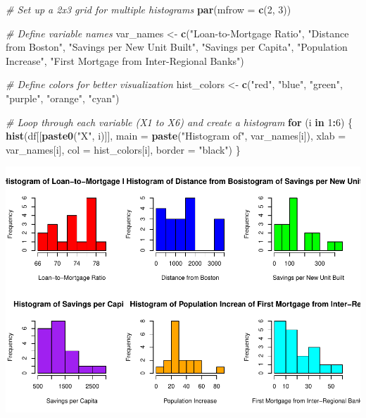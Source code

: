 \documentclass[
  12pt,
]{article}
\newenvironment{Shaded}{\begin{snugshade}}{\end{snugshade}}
\newcommand{\AttributeTok}[1]{\textcolor[rgb]{0.13,0.29,0.53}{#1}}
\newcommand{\CommentTok}[1]{\textcolor[rgb]{0.56,0.35,0.01}{\textit{#1}}}
\newcommand{\ControlFlowTok}[1]{\textcolor[rgb]{0.13,0.29,0.53}{\textbf{#1}}}
\newcommand{\DecValTok}[1]{\textcolor[rgb]{0.00,0.00,0.81}{#1}}
\newcommand{\FunctionTok}[1]{\textcolor[rgb]{0.13,0.29,0.53}{\textbf{#1}}}
\newcommand{\NormalTok}[1]{#1}
\newcommand{\OtherTok}[1]{\textcolor[rgb]{0.56,0.35,0.01}{#1}}
\newcommand{\SpecialCharTok}[1]{\textcolor[rgb]{0.81,0.36,0.00}{\textbf{#1}}}
\newcommand{\StringTok}[1]{\textcolor[rgb]{0.31,0.60,0.02}{#1}}
\begin{document}
\begin{Shaded}
\begin{Highlighting}[]
\CommentTok{\# Set up a 2x3 grid for multiple histograms}
\FunctionTok{par}\NormalTok{(}\AttributeTok{mfrow =} \FunctionTok{c}\NormalTok{(}\DecValTok{2}\NormalTok{, }\DecValTok{3}\NormalTok{))}

\CommentTok{\# Define variable names}
\NormalTok{var\_names }\OtherTok{\textless{}{-}} \FunctionTok{c}\NormalTok{(}\StringTok{"Loan{-}to{-}Mortgage Ratio"}\NormalTok{, }\StringTok{"Distance from Boston"}\NormalTok{, }
               \StringTok{"Savings per New Unit Built"}\NormalTok{, }\StringTok{"Savings per Capita"}\NormalTok{, }
               \StringTok{"Population Increase"}\NormalTok{, }\StringTok{"First Mortgage from Inter{-}Regional Banks"}\NormalTok{)}

\CommentTok{\# Define colors for better visualization}
\NormalTok{hist\_colors }\OtherTok{\textless{}{-}} \FunctionTok{c}\NormalTok{(}\StringTok{"red"}\NormalTok{, }\StringTok{"blue"}\NormalTok{, }\StringTok{"green"}\NormalTok{, }\StringTok{"purple"}\NormalTok{, }\StringTok{"orange"}\NormalTok{, }\StringTok{"cyan"}\NormalTok{)}

\CommentTok{\# Loop through each variable (X1 to X6) and create a histogram}
\ControlFlowTok{for}\NormalTok{ (i }\ControlFlowTok{in} \DecValTok{1}\SpecialCharTok{:}\DecValTok{6}\NormalTok{) \{}
  \FunctionTok{hist}\NormalTok{(df[[}\FunctionTok{paste0}\NormalTok{(}\StringTok{"X"}\NormalTok{, i)]], }
       \AttributeTok{main =} \FunctionTok{paste}\NormalTok{(}\StringTok{"Histogram of"}\NormalTok{, var\_names[i]),}
       \AttributeTok{xlab =}\NormalTok{ var\_names[i], }
       \AttributeTok{col =}\NormalTok{ hist\_colors[i], }
       \AttributeTok{border =} \StringTok{"black"}\NormalTok{)}
\NormalTok{\}}
\end{Highlighting}
\end{Shaded}

\includegraphics{report1_r1_files/figure-latex/unnamed-chunk-4-3.pdf}
\end{document}
